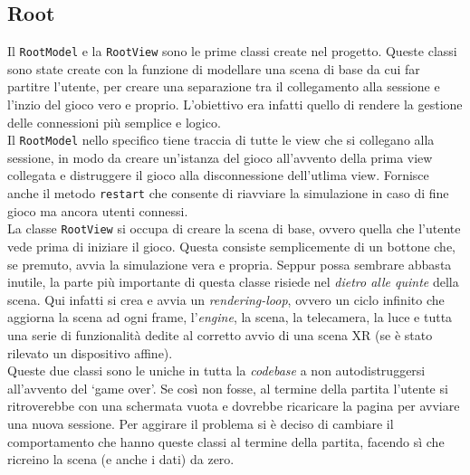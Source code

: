 \subsection{Root}\label{subsec:rootclass}
Il \texttt{RootModel} e la \texttt{RootView} sono le prime classi create nel progetto. Queste classi sono state create con la funzione di modellare una scena di base da cui far
partitre l'utente, per creare una separazione tra il collegamento alla sessione e l'inzio del gioco vero e proprio. L'obiettivo era infatti quello di rendere la gestione delle
connessioni più semplice e logico.\\
Il \texttt{RootModel} nello specifico tiene traccia di tutte le view che si collegano alla sessione, in modo da creare un'istanza del gioco all'avvento della prima view collegata e 
distruggere il gioco alla disconnessione dell'utlima view. Fornisce anche il metodo \texttt{restart} che consente di riavviare la simulazione in caso di fine gioco ma ancora utenti 
connessi.\\
La classe \texttt{RootView} si occupa di creare la scena di base, ovvero quella che l'utente vede prima di iniziare il gioco. Questa consiste semplicemente di un bottone che, se 
premuto, avvia la simulazione vera e propria. Seppur possa sembrare abbasta inutile, la parte più importante di questa classe risiede nel \textit{dietro alle quinte} della scena. 
Qui infatti si crea e avvia un \textit{rendering-loop}, ovvero un ciclo infinito che aggiorna la scena ad ogni frame, l'\textit{engine}, la scena, la telecamera, la luce e tutta
una serie di funzionalità dedite al corretto avvio di una scena XR (se è stato rilevato un dispositivo affine).\\
Queste due classi sono le uniche in tutta la \textit{codebase} a non autodistruggersi all'avvento del `game over'. Se così non fosse, al termine della partita l'utente si ritroverebbe
con una schermata vuota e dovrebbe ricaricare la pagina per avviare una nuova sessione. Per aggirare il problema si è deciso di cambiare il comportamento che hanno queste classi al 
termine della partita, facendo sì che ricreino la scena (e anche i dati) da zero.\\

